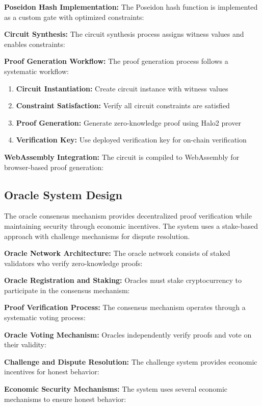 \documentclass[11pt,a4paper]{article}
\begin{document}
\textbf{Poseidon Hash Implementation:}
The Poseidon hash function is implemented as a custom gate with optimized constraints:


\textbf{Circuit Synthesis:}
The circuit synthesis process assigns witness values and enables constraints:


\textbf{Proof Generation Workflow:}
The proof generation process follows a systematic workflow:

\begin{enumerate}
    \item \textbf{Circuit Instantiation:} Create circuit instance with witness values
    \item \textbf{Constraint Satisfaction:} Verify all circuit constraints are satisfied
    \item \textbf{Proof Generation:} Generate zero-knowledge proof using Halo2 prover
    \item \textbf{Verification Key:} Use deployed verification key for on-chain verification
\end{enumerate}

\textbf{WebAssembly Integration:}
The circuit is compiled to WebAssembly for browser-based proof generation:


\subsection{Oracle System Design}

The oracle consensus mechanism provides decentralized proof verification while maintaining security through economic incentives. The system uses a stake-based approach with challenge mechanisms for dispute resolution.

\textbf{Oracle Network Architecture:}
The oracle network consists of staked validators who verify zero-knowledge proofs:


\textbf{Oracle Registration and Staking:}
Oracles must stake cryptocurrency to participate in the consensus mechanism:


\textbf{Proof Verification Process:}
The consensus mechanism operates through a systematic voting process:


\textbf{Oracle Voting Mechanism:}
Oracles independently verify proofs and vote on their validity:


\textbf{Challenge and Dispute Resolution:}
The challenge system provides economic incentives for honest behavior:


\textbf{Economic Security Mechanisms:}
The system uses several economic mechanisms to ensure honest behavior:
\end{document}
